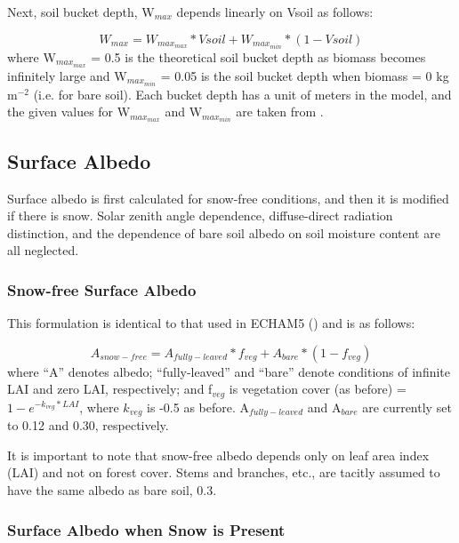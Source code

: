 Next, soil bucket depth, W$_{max}$ depends linearly on Vsoil as follows:

 \begin{equation}
W_{max} = W_{max_{max}} * Vsoil + W_{max_{min}} * (1 - Vsoil)
\end{equation}
where W$_{max_{max}}$ = 0.5 is the theoretical soil bucket depth as biomass becomes infinitely large and W$_{max_{min}}$ = 0.05 is the soil bucket depth when biomass = 0 kg m$^{-2}$ (i.e. for bare soil).  Each bucket depth has a unit of meters in the model, and the given values for W$_{max_{max}}$ and W$_{max_{min}}$ are taken from \cite{kleidon2006}.

\subsection{Surface Albedo}

Surface albedo is first calculated for snow-free conditions, and then it is modified if there is snow.  Solar zenith angle dependence, diffuse-direct radiation distinction, and the dependence of bare soil albedo on soil moisture content are all neglected.

\subsubsection{Snow-free Surface Albedo}

This formulation is identical to that used in ECHAM5 (\cite{rechid2009}) and is as follows:

\begin{equation}
A_{snow-free} = A_{fully-leaved} * f_{veg} + A_{bare} * (1-f_{veg})
\end{equation}
where ``A'' denotes albedo; ``fully-leaved'' and ``bare'' denote conditions of infinite LAI and zero LAI, respectively; and f$_{veg}$ is vegetation cover (as before) = $1 - e^{-k_{veg}*LAI}$, where $k_{veg}$ is -0.5 as before.  A$_{fully-leaved}$ and A$_{bare}$ are currently set to 0.12 and 0.30, respectively.

It is important to note that snow-free albedo depends only on leaf area index (LAI) and not on forest cover.  Stems and branches, etc., are tacitly assumed to have the same albedo as bare soil, 0.3.

\subsubsection{Surface Albedo when Snow is Present} 

